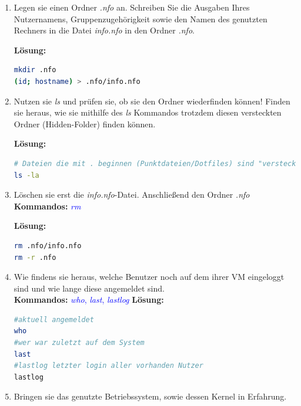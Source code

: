 \documentclass[paper=a4,fontsize=11pt]{scrartcl}%
\numberwithin{equation}{section}
\newenvironment{solution}
	{
		\color{blue}
		\textbf{Lösung:}
	}{}
\begin{document}
\begin{enumerate}
\begin{enumerate} [label=(\alph*)]
		\begin{solution}
        \begin{lstlisting}[style=Bash, language=Bash]
hostname
		\end{lstlisting}
		\end{solution}
          \item Legen sie einen Ordner \emph{.nfo} an. Schreiben Sie die Ausgaben Ihres Nutzernamens, Gruppenzugehörigkeit sowie den Namen des genutzten Rechners in die Datei \emph{info.nfo} in den Ordner \emph{.nfo}.
          
		\begin{solution}
        \begin{lstlisting}[style=Bash, language=Bash]
mkdir .nfo
(id; hostname) > .nfo/info.nfo
		\end{lstlisting}
		\end{solution}
          \item Nutzen sie \emph{ls} und prüfen sie, ob sie den Ordner wiederfinden können! Finden sie heraus, wie sie mithilfe des \emph{ls} Kommandos trotzdem diesen versteckten Ordner (Hidden-Folder) finden können.
          
		\begin{solution}
        \begin{lstlisting}[style=Bash, language=Bash]
# Dateien die mit . beginnen (Punktdateien/Dotfiles) sind "versteckt"
ls -la
		\end{lstlisting}
		\end{solution}
          \item Löschen sie erst die \emph{info.nfo}-Datei. Anschließend den Ordner \emph{.nfo}\\
          \textbf{Kommandos:} \textcolor{blue}{\emph{rm}}
          
		\begin{solution}
        \begin{lstlisting}[style=Bash, language=Bash]
rm .nfo/info.nfo
rm -r .nfo
		\end{lstlisting}
		\end{solution}
          \item Wie findens sie heraus, welche Benutzer noch auf dem ihrer VM eingeloggt sind und wie lange diese angemeldet sind.\\
          \textbf{Kommandos:} \textcolor{blue}{\emph{who}, \emph{last}, \emph{lastlog}}
          		\begin{solution}
        \begin{lstlisting}[style=Bash, language=Bash]
#aktuell angemeldet
who
#wer war zuletzt auf dem System
last
#lastlog letzter login aller vorhanden Nutzer
lastlog
		\end{lstlisting}
		\end{solution}
          \item Bringen sie das genutzte Betriebssystem, sowie dessen Kernel in Erfahrung.\\
          

\end{enumerate}
\end{enumerate}
\end{document}
